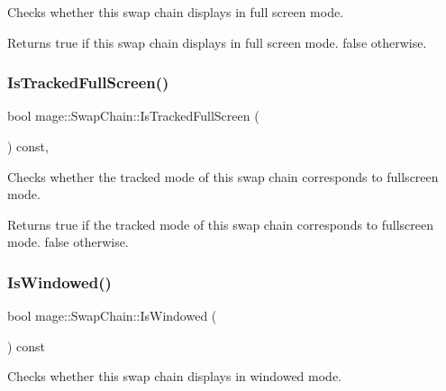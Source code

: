 Checks whether this swap chain displays in full screen mode.

\begin{DoxyReturn}{Returns}
{\ttfamily true} if this swap chain displays in full screen mode. {\ttfamily false} otherwise. 
\end{DoxyReturn}
\hypertarget{classmage_1_1_swap_chain_ad3b35e10612f7219cc4b6d61039e2f8c}{}\label{classmage_1_1_swap_chain_ad3b35e10612f7219cc4b6d61039e2f8c} 
\subsubsection{\texorpdfstring{Is\+Tracked\+Full\+Screen()}{IsTrackedFullScreen()}}
{\footnotesize\ttfamily bool mage\+::\+Swap\+Chain\+::\+Is\+Tracked\+Full\+Screen (\begin{DoxyParamCaption}{ }\end{DoxyParamCaption}) const\hspace{0.3cm}{\ttfamily [private]}, {\ttfamily [noexcept]}}

Checks whether the tracked mode of this swap chain corresponds to fullscreen mode.

\begin{DoxyReturn}{Returns}
{\ttfamily true} if the tracked mode of this swap chain corresponds to fullscreen mode. {\ttfamily false} otherwise. 
\end{DoxyReturn}
\hypertarget{classmage_1_1_swap_chain_a7cf71ec46d0af888b9b1daa890a54d39}{}\label{classmage_1_1_swap_chain_a7cf71ec46d0af888b9b1daa890a54d39} 
\subsubsection{\texorpdfstring{Is\+Windowed()}{IsWindowed()}}
{\footnotesize\ttfamily bool mage\+::\+Swap\+Chain\+::\+Is\+Windowed (\begin{DoxyParamCaption}{ }\end{DoxyParamCaption}) const\hspace{0.3cm}{\ttfamily [noexcept]}}

Checks whether this swap chain displays in windowed mode.

